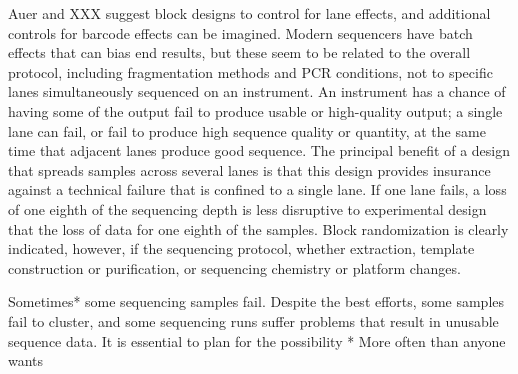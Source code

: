 \documentclass[graybox]{svmult}
\begin{document}
Auer and XXX suggest block designs to control for lane effects, and additional controls for barcode effects can be imagined.  Modern sequencers have batch effects that can bias end results, but these seem to be related to the overall protocol, including fragmentation methods and PCR conditions, not to specific lanes simultaneously sequenced on an instrument.    An instrument has a chance of having some of the output fail to produce usable or high-quality output; a single lane can fail, or fail to produce high sequence quality or quantity, at the same time that adjacent lanes produce good sequence.
The principal benefit of a design that spreads samples across several lanes is that this design provides  insurance against a technical failure that is confined to a single lane.  If one lane fails, a loss of one eighth of the sequencing depth is less disruptive to experimental design that the loss of data for one eighth of the samples.   Block randomization is clearly indicated, however, if the sequencing protocol, whether extraction, template construction or purification, or sequencing chemistry or platform changes.

Sometimes* some sequencing samples fail.   Despite the best efforts, some samples fail to cluster, and some sequencing runs suffer problems that result in unusable sequence data.  It is essential to plan for the possibility
* More often than anyone wants
\end{document}
